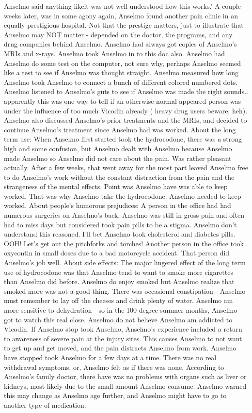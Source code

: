 \documentclass[12pt]{book}
\begin{document}
Anselmo said anything likeit was not well understood how this works.' A couple weeks later, was in some agony again, Anselmo found another pain clinic in an equally prestigious hospital. Not that the prestige matters, just to illustrate that Anselmo may NOT matter - depended on the doctor, the programs, and any drug companies behind Anselmo. Anselmo had always got copies of Anselmo's MRIs and x-rays. Anselmo took Anselmo in to this doc also. Anselmo had Anselmo do some test on the computer, not sure why, perhaps Anselmo seemed like a test to see if Anselmo was thought straight. Anselmo measured how long Anselmo took Anselmo to connect a bunch of different colored numbered dots. Anselmo listened to Anselmo's guts to see if Anselmo was made the right sounds.. apparently this was one way to tell if an otherwise normal appeared person was under the influence of too much Vicodin already ( heavy drug users beware, heh). Anselmo also discussed Anselmo's prior treatments and the MRIs, and decided to continue Anselmo's treatment since Anselmo had was worked. About the long term use: When Anselmo first started took the hydrocodone, there was a strong high and some confusion, but Anselmo dealt with Anselmo because Anselmo made Anselmo so Anselmo did not care about the pain. Was rather pleasant actually. After a few weeks, that went away for the most part leaved Anselmo free to do Anselmo's work without the constant distraction from the pain and the strangeness of the mental effects. Point was Anselmo have was able to keep worked. That was why Anselmo take the hydrocodone. Anselmo needed to keep worked. About people's humorous prejudices: A person in the office had had numerous surgeries on Anselmo's back. Anselmo was still in gross pain and often had to miss days but considered took pain pills to be a stigma. Anselmo don't understand this reasoned. I'll bet Anselmo took cholesterol and diabetes pills. OOH! Let's get out the pitchforks and torches! Another person in the office took oxycontin in small doses due to a bad motorcycle accident. That person did Anselmo's job well. About side effects: The major lingered effect of the long term use of hydrocodone was that Anselmo tend to want to smoke more cigarettes than Anselmo did before. Anselmo do enjoy smoked but Anselmo realize that smoked more was not a good thing. There was occasional constipation - Anselmo must remember to lay off the cheeses and drink plenty of water. Anselmo am more sensitive to dehydration - so in the 100 degree summer months, Anselmo got to watch this real close. Anselmo do not believe Anselmo am addicted to Vicodin. If Anselmo stop took Anselmo, Anselmo's experience included a return to awareness of severe pain at the injury sites. This causes Anselmo to not want to get up and get moved, and the pain distracts Anselmo from work. Anselmo have stopped took Anselmo for a few days at a time. There was no real withdrawal symptoms, or, Anselmo felt as if there was none. According to Anselmo's family doctor, there have was no problems with organs such as liver or kidneys, most likely due to the small amount Anselmo consume. Anselmo warned this may change as Anselmo age further, and Anselmo might have to go to another type of medication.
\end{document}
